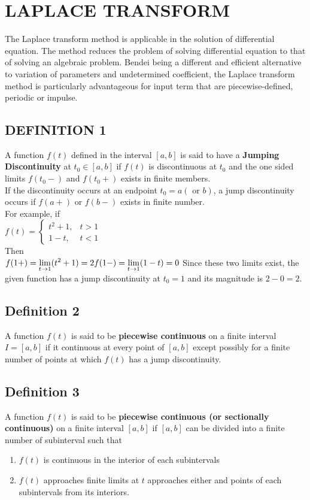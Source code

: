 \documentclass[11pt]{report}
\newcommand{\ft}{f(t)}
\newcommand{\sps}{\\[0.2cm]}
\newcommand{\bt}[1]{\textbf{#1}}
\newcommand{\dsp}{\displaystyle}
\begin{document}
	\section{LAPLACE TRANSFORM}
	The Laplace transform method is applicable in the solution of differential equation. The method reduces the problem of solving differential equation to that of solving an algebraic problem.  Bendei being a different and efficient alternative to variation of parameters and undetermined coefficient, the Laplace transform method is particularly advantageous for input term that are piecewise-defined, periodic or impulse.
	
	\subsection{DEFINITION 1}
	A function $\ft$ defined in the interval $[a,b]$ is said to have a \bt{Jumping Discontinuity} at $t_0\in [a,b]$ if $\ft$ is discontinuous at $t_0$ and the one sided limits $f(t_0-)$ and $f(t_0+)$ exists in finite members.\sps
	If the discontinuity occurs at an endpoint $t_0=a(\text{ or } b)$, a jump discontinuity occurs if $f(a+)$ or $f(b-)$ exists in finite number.\sps
	For example, if\\
	$\dsp f(t) = \left\{ \begin{array}{lr}
		t^2 + 1, & t>1\\
		1-t, & t<1
	\end{array} \right.
	$\sps
	Then \sps
	$\dsp
		f(1+) = \lim\limits_{t\rightarrow 1}(t^2+1) = 2\sps
		f(1-) = \lim\limits_{t\rightarrow 1}(1-t) = 0\sps
	$
	Since these two limits exist, the given function has a jump discontinuity at $t_0=1$ and its magnitude is $2-0=2$.
	
	\subsection{Definition 2}
	A function $\ft$ is said to be \bt{piecewise continuous} on a finite interval $I=[a,b]$ if it continuous at every point of $[a,b]$ except possibly for a finite number of points at which $\ft$ has a jump discontinuity.
	
	\subsection{Definition 3}
	\label{sec:2_2_3}
	A function $\ft$ is said to be \bt{piecewise continuous (or sectionally continuous)} on a finite interval $[a,b]$ if $[a,b]$ can be divided into a finite number of subinterval such that 
	\begin{enumerate}
		\item $\ft$ is continuous in the interior of each subintervals
		\item $\ft$ approaches finite limits at $t$ approaches either and points of each subintervals from its interiors.
	\end{enumerate}	
	
\end{document}
